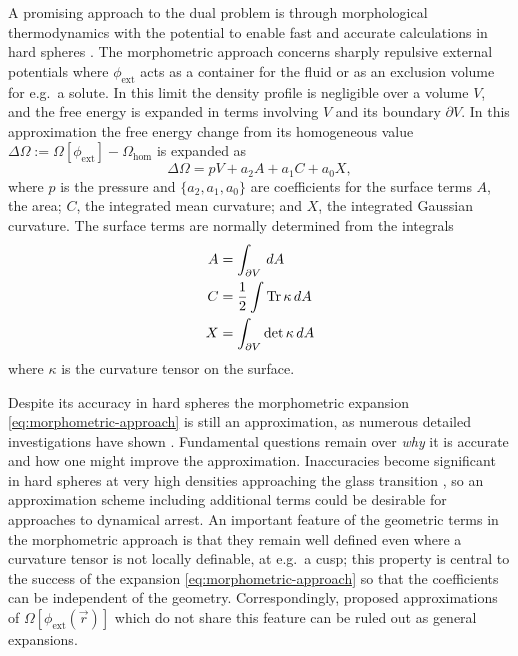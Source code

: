 \documentclass[11pt,twoside]{report}
\begin{document}
A promising approach to the dual problem is through morphological thermodynamics \cite{KonigPRL2004} with the potential to enable fast and accurate calculations in hard spheres \cite{RothPRL2006,Hansen-GoosPRL2007,RobinsonPRL2019}.
The morphometric approach concerns sharply repulsive external potentials where $\phi_\mathrm{ext}$ acts as a container for the fluid or as an exclusion volume for e.g.\ a solute.
In this limit the density profile is negligible over a volume $V$, and the free energy is expanded in terms involving $V$ and its boundary $\partial V$.
In this approximation the free energy change from its homogeneous value $\Delta \Omega := \Omega[\phi_\mathrm{ext}] - \Omega_\mathrm{hom}$ is expanded as
\begin{equation}\label{eq:morphometric-approach}
  \Delta \Omega
  =
  p V + a_2 A + a_1 C + a_0 X,
\end{equation}
where $p$ is the pressure and $\{a_2,a_1,a_0\}$ are coefficients for the surface terms $A$, the area; $C$, the integrated mean curvature; and $X$, the integrated Gaussian curvature.
The surface terms are normally determined from the integrals
\begin{subequations}
  \begin{align}
    A &= \int_{\partial V} \, dA \\
    C &= \frac{1}{2} \int \operatorname*{Tr}{\kappa} \, dA \\
    X &= \int_{\partial V} \det{\kappa} \, dA
  \end{align}
\end{subequations}
where $\kappa$ is the curvature tensor on the surface.

Despite its accuracy in hard spheres the morphometric expansion \eqref{eq:morphometric-approach} is still an approximation, as numerous detailed investigations have shown \cite{OettelEL2009,AshtonPRE2011,LairdPRE2012,BlokhuisPRE2013,UrrutiaPRE2014,Hansen-GoosJCP2014}.
Fundamental questions remain over \emph{why} it is accurate and how one might improve the approximation.
Inaccuracies become significant in hard spheres at very high densities approaching the glass transition \cite{RobinsonPRL2019,RobinsonPRE2019}, so an approximation scheme including additional terms could be desirable for approaches to dynamical arrest.
An important feature of the geometric terms in the morphometric approach is that they remain well defined even where a curvature tensor is not locally definable, at e.g.\ a cusp; this property is central to the success of the expansion \eqref{eq:morphometric-approach} so that the coefficients can be independent of the geometry.
Correspondingly, proposed approximations of $\Omega[\phi_\mathrm{ext}(\vec{r})]$ which do not share this feature can be ruled out as general expansions.
\end{document}
